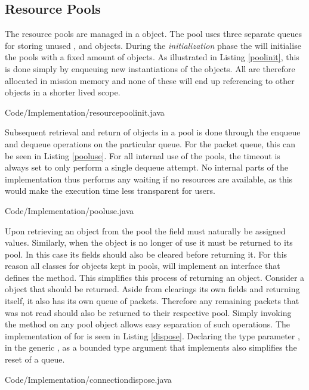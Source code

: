 \subsection{Resource Pools} %
\label{sub:resource_pools}
The resource pools are managed in a  object. The pool uses three separate queues for storing unused ,  and  objects. During the \textit{initialization} phase the  will initialise the pools with a fixed amount of objects. As illustrated in Listing \ref{poolinit}, this is done simply by enqueuing new instantiations of the objects. All are therefore allocated in mission memory and none of these will end up referencing to other objects in a shorter lived scope. 

{Code/Implementation/resourcepoolinit.java}

Subsequent retrieval and return of objects in a pool is done through the enqueue and dequeue operations on the particular queue. For the packet queue, this can be seen in Listing \ref{pooluse}. For all internal use of the pools, the timeout is always set to only perform a single dequeue attempt. No internal parts of the implementation thus performs any waiting if no resources are available, as this would make the execution time less transparent for users.

{Code/Implementation/pooluse.java}

Upon retrieving an object from the pool the field must naturally be assigned values. Similarly, when the object is no longer of use it must be returned to its pool. In this case its fields should also be cleared before returning it. For this reason all classes for objects kept in pools, will implement an  interface that defines the  method. This simplifies this process of returning an object. Consider a  object that should be returned. Aside from clearings its own fields and returning itself, it also has its own queue of packets. Therefore any remaining packets that was not read should also be returned to their respective pool. Simply invoking the  method on any pool object allows easy separation of such operations. The implementation of  for  is seen in Listing \ref{dispose}. Declaring the type parameter , in the generic , as a bounded type argument that implements  also simplifies the reset of a queue.

{Code/Implementation/connectiondispose.java}

